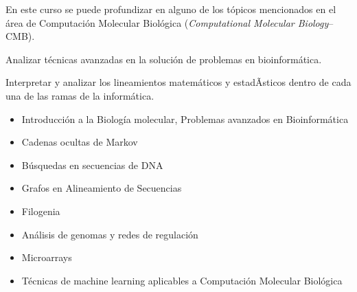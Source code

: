 \begin{syllabus}


\begin{justification}
En este curso se puede profundizar en alguno de los tópicos
mencionados en el área de Computación Molecular Biológica (\textit{Computational Molecular Biology}--CMB).\nocite{dav01,pav04,pete00}
\end{justification}

\begin{goals}
\item Analizar técnicas avanzadas en la solución de problemas en bioinformática.
\item Interpretar y analizar los lineamientos matemáticos y estadÃ­sticos dentro de cada una de las ramas de la informática.
\end{goals}

\begin{outcomes}
\end{outcomes}

\begin{itemize}
\item Introducción a la Biología molecular, Problemas avanzados en Bioinformática
\item Cadenas ocultas de Markov
\item Búsquedas en secuencias de DNA
\item Grafos en Alineamiento de Secuencias
\item Filogenia
\item Análisis de genomas y redes de regulación
\item Microarrays
\item Técnicas de machine learning aplicables a Computación Molecular Biológica
\end{itemize}



\begin{coursebibliography}
\end{coursebibliography}

\end{syllabus}

